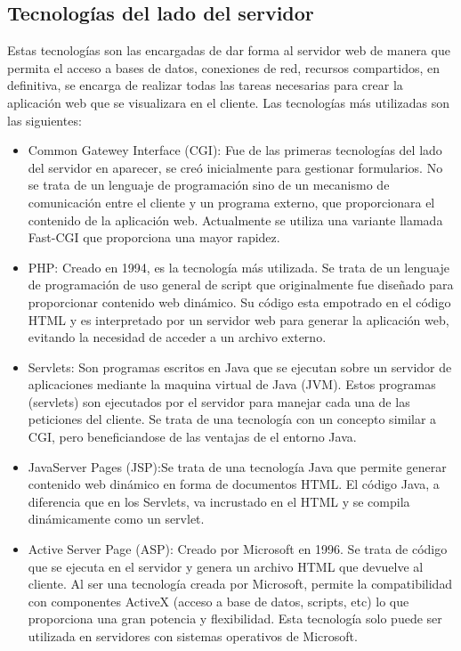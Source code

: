 \subsection{Tecnologías del lado del servidor}
Estas tecnologías son las encargadas de dar forma al servidor web de manera que permita el acceso a bases de datos, conexiones de red, recursos compartidos, en definitiva, se encarga de realizar todas las tareas necesarias para crear la aplicación web que se visualizara en el cliente. Las tecnologías más utilizadas son las siguientes:
\begin{itemize}
	\item Common Gatewey Interface (CGI): Fue de las primeras tecnologías del lado del servidor en aparecer, se creó inicialmente para gestionar formularios. No se trata de un lenguaje de programación sino  de un mecanismo de comunicación entre el cliente y un programa externo, que proporcionara el contenido de la aplicación web. Actualmente se utiliza una variante llamada Fast-CGI que proporciona una mayor rapidez.
	\item PHP: Creado en 1994, es la tecnología más utilizada. Se trata de un lenguaje de programación de uso general de script que originalmente fue diseñado para proporcionar contenido web dinámico. Su código esta empotrado en el código HTML y es interpretado por un servidor web para generar la aplicación web, evitando la necesidad de acceder a un archivo externo.
	\item Servlets: Son programas escritos en Java que se ejecutan sobre un servidor de aplicaciones mediante la maquina virtual de Java (JVM). Estos programas (servlets) son ejecutados por el servidor para manejar cada una de las peticiones del cliente. Se trata de una tecnología con un concepto similar a CGI, pero beneficiandose de las ventajas de el entorno Java.
	\item JavaServer Pages (JSP):Se trata de una tecnología Java que permite generar contenido web dinámico en forma de documentos HTML. El código Java, a diferencia que en los Servlets, va incrustado en el HTML y se compila dinámicamente como un servlet.
	\item Active Server Page (ASP): Creado por Microsoft en 1996. Se trata de código que se ejecuta en el servidor y genera un archivo HTML que devuelve al cliente. Al ser una tecnología creada por Microsoft, permite la compatibilidad con componentes ActiveX (acceso a base de datos, scripts, etc) lo que proporciona una gran potencia y flexibilidad. Esta tecnología solo puede ser utilizada en servidores con sistemas operativos de Microsoft.

\end{itemize}
